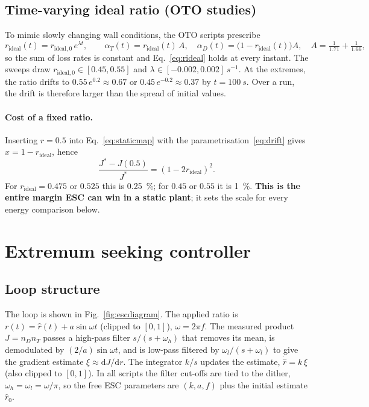 \documentclass[11pt,a4paper]{article}
\newcommand{\nD}{n_D}
\newcommand{\nT}{n_T}
\newcommand{\rid}{r_\mathrm{ideal}}
\newcommand{\rhat}{\hat r}
\begin{document}
\subsection{Time-varying ideal ratio (OTO studies)}
To mimic slowly changing wall conditions, the OTO scripts prescribe
\begin{equation}
  \rid(t) = r_{\mathrm{ideal},0}\,e^{\lambda t},\qquad
  \alpha_T(t) = \rid(t)\,A,\quad \alpha_D(t)=\big(1-\rid(t)\big)A,\quad A=\tfrac{1}{1.71}+\tfrac{1}{1.66},
  \label{eq:drift}
\end{equation}
so the sum of loss rates is constant and Eq.~\eqref{eq:rideal} holds at every instant.
The sweeps draw $r_{\mathrm{ideal},0}\in[0.45,0.55]$ and $\lambda\in[-0.002,0.002]\,\si{s^{-1}}$. At the extremes, the ratio drifts to $0.55\,e^{0.2}\approx0.67$ or $0.45\,e^{-0.2}\approx0.37$ by $t=\SI{100}{s}$. Over a run, the drift is therefore larger than the spread of initial values.

\paragraph{Cost of a fixed ratio.} Inserting $r=0.5$ into Eq.~\eqref{eq:staticmap} with the parametrisation~\eqref{eq:drift} gives $x=1-\rid$, hence
\begin{equation}
  \frac{J^\ast - J(0.5)}{J^\ast} = (1-2\rid)^2 .
  \label{eq:fixedloss}
\end{equation}
For $\rid=0.475$ or $0.525$ this is \SI{0.25}{\percent}; for $0.45$ or $0.55$ it is \SI{1}{\percent}. \textbf{This is the entire margin ESC can win in a static plant}; it sets the scale for every energy comparison below.

\section{Extremum seeking controller}
\label{sec:esc}

\subsection{Loop structure}
The loop is shown in Fig.~\ref{fig:escdiagram}. The applied ratio is
$r(t)=\rhat(t)+a\sin\omega t$ (clipped to $[0,1]$), $\omega=2\pi f$.
The measured product $J=\nD\nT$ passes a high-pass filter $s/(s+\omega_h)$ that removes its mean, is demodulated by $(2/a)\sin\omega t$, and is low-pass filtered by $\omega_l/(s+\omega_l)$ to give the gradient estimate $\xi\approx \mathrm{d}J/\mathrm{d}r$. The integrator $k/s$ updates the estimate, $\dot{\rhat}=k\,\xi$ (also clipped to $[0,1]$).
In all scripts the filter cut-offs are tied to the dither, $\omega_h=\omega_l=\omega/\pi$, so the free ESC parameters are $(k,a,f)$ plus the initial estimate $\rhat_0$.
\end{document}

